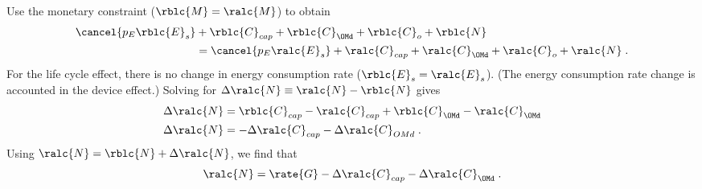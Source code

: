 \begin{landscape}
{    Use the monetary constraint ($\rblc{M} = \ralc{M}$) to obtain
  \begin{align} \label{M_dot_bal_lc}
  \cancel{p_E \rblc{E}_s} &+ \rblc{C}_{cap} + \rblc{C}_{\OMd} + \rblc{C}_o + \rblc{N} \nonumber \\
  &= \cancel{p_E \ralc{E}_s} + \ralc{C}_{cap} + \ralc{C}_{\OMd} + \ralc{C}_o  + \ralc{N} \; .
  \end{align}
  For the life cycle effect, 
  there is no change in energy consumption rate ($\rblc{E}_s = \ralc{E}_s$).
  (The energy consumption rate change is accounted in the device effect.)
  Solving for $\Delta \ralc{N} \equiv \ralc{N} - \rblc{N}$ gives
  \begin{align}
  \Delta \ralc{N} &= \rblc{C}_{cap} - \ralc{C}_{cap} + \rblc{C}_{\OMd} - \ralc{C}_{\OMd} \\
  \Delta \ralc{N} &= - \Delta \ralc{C}_{cap} - \Delta \ralc{C}_{OMd} \; .
  \end{align}
  Using $\ralc{N} = \rblc{N} + \Delta \ralc{N}$, we find that
  \begin{equation}
  \ralc{N} = \rate{G} - \Delta \ralc{C}_{cap} - \Delta \ralc{C}_{\OMd} \; .
  \end{equation}
}

\end{landscape}
